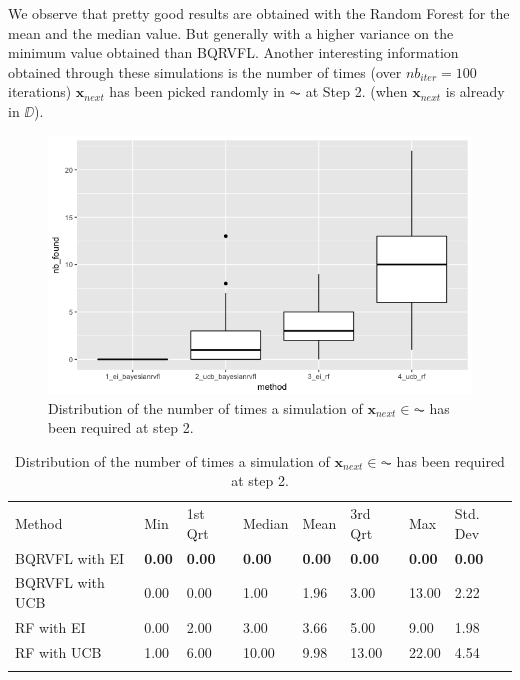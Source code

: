 We observe that pretty good results are obtained with the Random Forest for the mean and the median value. But generally with a higher variance on the minimum value obtained than BQRVFL. Another interesting information obtained through these simulations is the number of times (over $nb_{iter} = 100$ iterations) $\textbf{x}_{next}$ has been picked randomly in $\AC$ at Step 2. (when $\textbf{x}_{next}$ is already in $\DD$). 

\begin{figure}[!htb]
\centering
\includegraphics[width=12cm]{gfx/chapter-bayesianrvfl/nb_is_found.png}
\caption{Distribution of the number of times a simulation of $\textbf{x}_{next} \in \AC$ has been required at step 2.}
\label{nb_is_found_dist}
\end{figure}

\newpage

\begin{table}[!htb]
\begin{center}
\caption{Distribution of the number of times a simulation of $\textbf{x}_{next} \in \AC$ has been required at step 2.}
\label{tab:nb_sims}       %
\begin{tabular}{llllllll}
\hline\noalign{\smallskip}
Method & Min & 1st Qrt  & Median & Mean  & 3rd Qrt  & Max & Std. Dev \\
\noalign{\smallskip}\hline\noalign{\smallskip}
 BQRVFL with EI  & \textbf{0.00} & \textbf{0.00} & \textbf{0.00}  & \textbf{0.00} & \textbf{0.00} & \textbf{0.00}  & \textbf{0.00} \\
 BQRVFL with UCB & 0.00 & 0.00 & 1.00  & 1.96 & 3.00 & 13.00 & 2.22 \\
 RF with EI      & 0.00 & 2.00 & 3.00  & 3.66 & 5.00 & 9.00 & 1.98 \\
 RF with UCB     & 1.00 & 6.00 & 10.00 & 9.98 & 13.00 & 22.00 & 4.54 \\
\noalign{\smallskip}\hline
\end{tabular}
\end{center}
\end{table}

